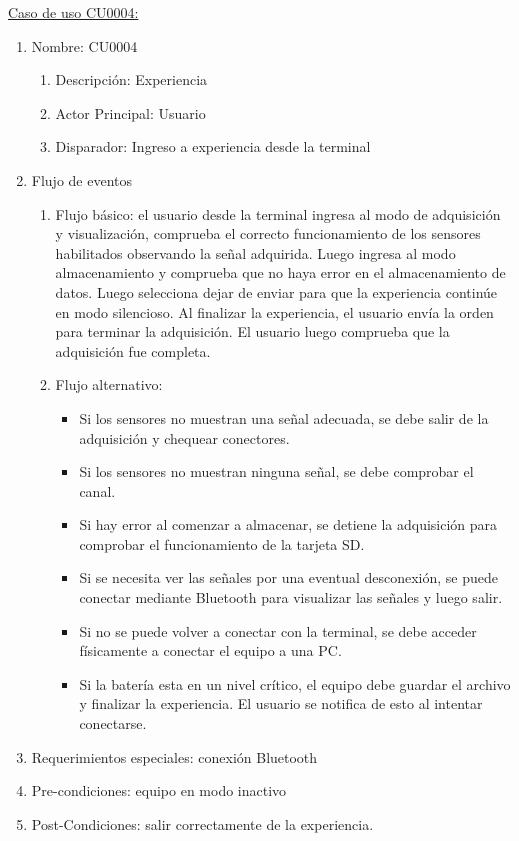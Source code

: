 	\underline{Caso de uso CU0004:}

	\begin{enumerate} 
		\item Nombre: CU0004
		\begin{enumerate} [label*=\arabic*.]
			\item Descripción: Experiencia
			\item Actor Principal: Usuario
			\item Disparador: Ingreso a experiencia desde la terminal
		\end{enumerate}
		\item Flujo de eventos
		\begin{enumerate} [label*=\arabic*.]
			\item Flujo básico: el usuario desde la terminal ingresa al modo de adquisición y visualización, comprueba el correcto funcionamiento de los sensores habilitados observando la señal adquirida. Luego ingresa al modo almacenamiento y comprueba que no haya error en el almacenamiento de datos. Luego selecciona dejar de enviar para que la experiencia continúe en modo silencioso. Al finalizar la experiencia, el usuario envía la orden para terminar la adquisición. El usuario luego comprueba que la adquisición fue completa.
			\item Flujo alternativo:
			\begin{itemize}
				\item Si los sensores no muestran una señal adecuada, se debe salir de la adquisición y chequear conectores.
				\item Si los sensores no muestran ninguna señal, se debe comprobar el canal.
				\item Si hay error al comenzar a almacenar, se detiene la adquisición para comprobar el funcionamiento de la tarjeta SD.
				\item Si se necesita ver las señales por una eventual desconexión, se puede conectar mediante Bluetooth para visualizar las señales y luego salir. 
				\item Si no se puede volver a conectar con la terminal, se debe acceder físicamente a conectar el equipo a una PC.
				\item Si la batería esta en un nivel crítico, el equipo debe guardar el archivo y finalizar la experiencia. El usuario se notifica de esto al intentar conectarse.					
			\end{itemize}				
		\end{enumerate}

		\item Requerimientos especiales: conexión Bluetooth
		\item Pre-condiciones: equipo en modo inactivo
		\item Post-Condiciones: salir correctamente de la experiencia.
	\end{enumerate}

